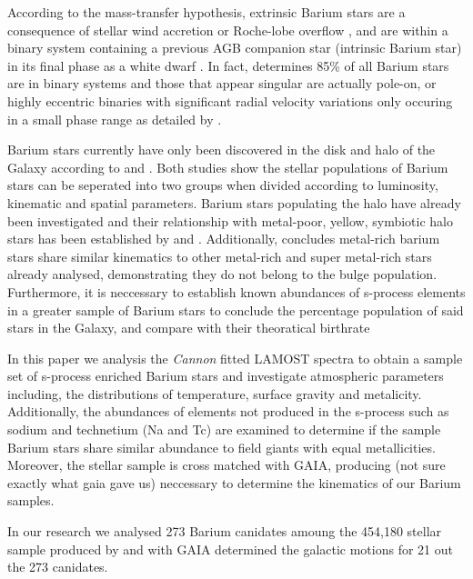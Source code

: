 \documentclass[a4paper,fleqn,usenatbib]{mnras}
\begin{document}
According to the mass-transfer hypothesis, extrinsic Barium stars are a consequence of stellar wind accretion \citep{boffin1988,jorissen1992} or Roche-lobe overflow \citep{webbink1986}, and are within a binary system containing a previous AGB companion star (intrinsic Barium star) in its final phase as a white dwarf \citep{bohm1980,bohm1984}. In fact, \citet{mcclure1983} determines 85\% of all Barium stars are in binary systems and those that appear singular are actually pole-on, or highly eccentric binaries with significant radial velocity variations only occuring in a small phase range as detailed by \citet{pourbaix2004}.

Barium stars currently have only been discovered in the disk and halo of the Galaxy according to \citet{gomez1997} and \citet{mennessier1997}. Both studies show the stellar populations of Barium stars can be seperated into two groups when divided according to luminosity, kinematic and spatial parameters. Barium stars populating the halo have already been investigated \citep[e.g.][]{junqueira2001,drake2008,pereira2009,allen2006} and their relationship with metal-poor, yellow, symbiotic halo stars has been established by \citet{jorissen2005} and \citet{pereira2009}. Additionally, \citet{pereira2011} concludes metal-rich barium stars share similar kinematics to other metal-rich and super metal-rich stars already analysed, demonstrating they do not belong to the bulge population. Furthermore, it is neccessary to establish known abundances of s-process elements in a greater sample of Barium stars to conclude the percentage population of said stars in the Galaxy, and compare with their theoratical birthrate \citep{han1995}

In this paper we analysis the \textit{Cannon} fitted LAMOST spectra \citep{ho2017} to obtain a sample set of s-process enriched Barium stars and investigate atmospheric parameters including, the distributions of temperature, surface gravity and metalicity. Additionally, the abundances of elements not produced in the s-process such as sodium and technetium (Na and Tc) are examined to determine  if the sample Barium stars share similar abundance to field giants with equal metallicities. Moreover, the stellar sample is cross matched with GAIA, producing (not sure exactly what gaia gave us) neccessary to determine the kinematics of our Barium samples. 

In our research we analysed 273 Barium canidates amoung the 454,180 stellar sample produced by \citet{ho2017} and with GAIA determined the galactic motions for 21 out the 273 canidates.
\end{document}

